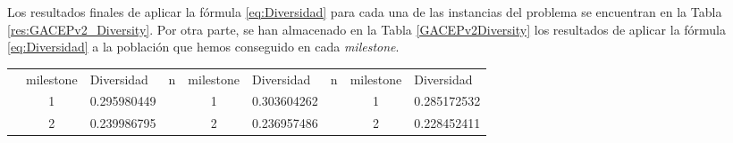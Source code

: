 Los resultados finales de aplicar la fórmula \ref{eq:Diversidad} para cada una de las instancias del problema se encuentran en la Tabla \ref{res:GACEPv2_Diversity}. 
Por otra parte, se han almacenado en la Tabla \ref{GACEPv2Diversity} los resultados de aplicar la fórmula \ref{eq:Diversidad} a la población que hemos conseguido en cada \textit{milestone}.

\begin{table}[h]
\begin{tabular}{|cclcclccl|}
\hline
\rowcolor[HTML]{FFFFC7} 
\multicolumn{9}{|c|}{\cellcolor[HTML]{FFFFC7}GACEPv2}                                                                                                                                                                                                                                                                                                                                                                                                                                                                                                      \\ \hline
\rowcolor[HTML]{FCE6AB} 
\multicolumn{1}{|c|}{\cellcolor[HTML]{FCE6AB}n}                               & \multicolumn{1}{c|}{\cellcolor[HTML]{FCE6AB}milestone} & \multicolumn{1}{l|}{\cellcolor[HTML]{FCE6AB}Diversidad}  & \multicolumn{1}{c|}{\cellcolor[HTML]{FCE6AB}n}                               & \multicolumn{1}{c|}{\cellcolor[HTML]{FCE6AB}milestone} & \multicolumn{1}{l|}{\cellcolor[HTML]{FCE6AB}Diversidad}  & \multicolumn{1}{c|}{\cellcolor[HTML]{FCE6AB}n}                               & \multicolumn{1}{c|}{\cellcolor[HTML]{FCE6AB}milestone} & Diversidad  \\ \hline
\rowcolor[HTML]{DAE8FC} 
\multicolumn{1}{|c|}{\cellcolor[HTML]{FFFFC7}}                                & \multicolumn{1}{c|}{\cellcolor[HTML]{DAE8FC}1}         & \multicolumn{1}{l|}{\cellcolor[HTML]{DAE8FC}0.295980449} & \multicolumn{1}{c|}{\cellcolor[HTML]{FFFFC7}}                                & \multicolumn{1}{c|}{\cellcolor[HTML]{DAE8FC}1}         & \multicolumn{1}{l|}{\cellcolor[HTML]{DAE8FC}0.303604262} & \multicolumn{1}{c|}{\cellcolor[HTML]{FFFFC7}}                                & \multicolumn{1}{c|}{\cellcolor[HTML]{DAE8FC}1}         & 0.285172532 \\ \cline{2-3} \cline{5-6} \cline{8-9} 
\rowcolor[HTML]{DDFDFF} 
\multicolumn{1}{|c|}{\cellcolor[HTML]{FFFFC7}}                                & \multicolumn{1}{c|}{\cellcolor[HTML]{DDFDFF}2}         & \multicolumn{1}{l|}{\cellcolor[HTML]{DDFDFF}0.239986795} & \multicolumn{1}{c|}{\cellcolor[HTML]{FFFFC7}}                                & \multicolumn{1}{c|}{\cellcolor[HTML]{DDFDFF}2}         & \multicolumn{1}{l|}{\cellcolor[HTML]{DDFDFF}0.236957486} & \multicolumn{1}{c|}{\cellcolor[HTML]{FFFFC7}}                                & \multicolumn{1}{c|}{\cellcolor[HTML]{DDFDFF}2}         & 0.228452411 \\ \cline{2-3} \cline{5-6} \cline{8-9} 

\end{tabular}
\end{table}
